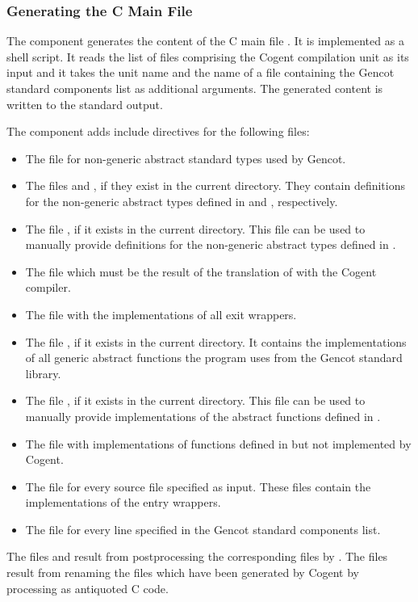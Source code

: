 \subsubsection{Generating the C Main File}

The component  generates the content of the C main file . 
It is implemented as a shell script. It reads the list of
 files comprising the Cogent compilation unit as its input and it takes the unit name 
and the name of a file containing the Gencot standard components list as additional arguments. The generated content 
is written to the standard output. 

The component adds include directives for the following files:
\begin{itemize}
\item The file  for non-generic abstract standard types used by Gencot.
\item The files  and , if they exist in the current directory. 
They contain definitions for the non-generic abstract types defined in  and 
, respectively.
\item The file , if it exists in the current directory. This file can be used to
manually provide definitions for the non-generic abstract types defined in .
\item The file  which must be the result of the translation of 
with the Cogent compiler.
\item The file  with the implementations of all exit wrappers.
\item The file , if it exists in the current directory. It contains the 
implementations of all generic abstract functions the program uses from the Gencot standard library.
\item The file , if it exists in the current directory. This file can be used to
manually provide implementations of the abstract functions defined in .
\item The file  with implementations of functions defined in 
but not implemented by Cogent.
\item The file  for every source file  specified as input. These files contain
the implementations of the entry wrappers.
\item The file  for every line  specified in the Gencot standard
components list.
\end{itemize}

The files  and  result from postprocessing the corresponding 
 files by . The files  result from renaming the files
 which have been generated by Cogent by processing  as antiquoted C code.
